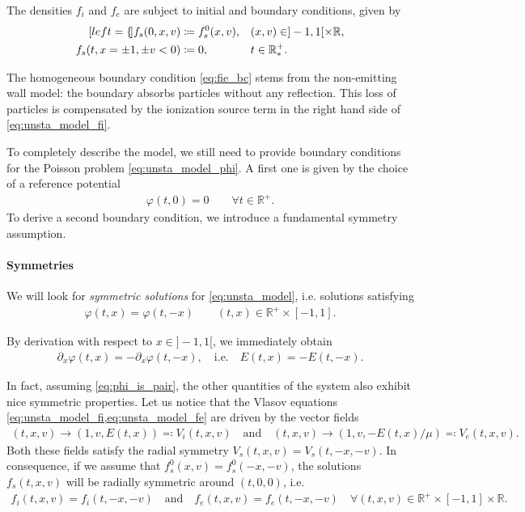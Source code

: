 \documentclass{article}
\numberwithin{equation}{section}
\newcommand{\R}{\mathbb{R}}
\newcommand{\mysubeq}[2]{ %
	\begin{subequations}\label{#1}
		\begin{align}[left = {\empheqlbrace}]
			#2
		\end{align}
	\end{subequations}	
}
\begin{document}
The densities $f_i$ and $f_e$ are subject to initial and boundary conditions, given by
\mysubeq{eq:unsta_model_bc}{
	f_{s}(0,x,v) &\coloneqq f_{s}^0(x,v), && (x,v) \in ]-1,1[ \times \R, \label{eq:init} \\
	f_{s}(t,x=\pm 1,\pm v < 0) &\coloneqq 0,  && t \in \R^+_*. \label{eq:fie_bc}
}
The homogeneous boundary condition \cref{eq:fie_bc} stems from the non-emitting wall model: the boundary absorbs particles without any reflection. This loss of particles is compensated by the ionization source term in the right hand side of \eqref{eq:unsta_model_fi}. 

To completely describe the model, we still need to provide boundary conditions for the Poisson problem \cref{eq:unsta_model_phi}. A first one is given by the choice of a reference potential
\begin{align}
	\varphi(t,0) = 0 \quad \quad \forall t \in \R^+. \label{eq:phi_nul_0}
\end{align}
To derive a second boundary condition, we introduce a fundamental symmetry assumption.

\paragraph{Symmetries}

We will look for \emph{symmetric solutions} for \cref{eq:unsta_model}, i.e. solutions satisfying 
\begin{align}\label{eq:phi_is_pair}
	\varphi(t,x) = \varphi (t,-x) \quad \quad (t,x) \in \R^+ \times [-1,1].
\end{align}

By derivation with respect to $x \in ]-1,1[$, we immediately obtain 
\begin{align*}
	\partial_x \varphi(t,x) = - \partial_x \varphi (t,-x), \quad \text{i.e.} \quad E(t,x) = - E(t,-x).
\end{align*}
 
In fact, assuming \cref{eq:phi_is_pair}, the other quantities of the system also exhibit nice symmetric properties. Let us notice that the Vlasov equations \cref{eq:unsta_model_fi,eq:unsta_model_fe} are driven by the vector fields
\begin{align*}
	(t,x,v) \to (1, v, E(t,x)) \eqqcolon V_i(t,x,v) \quad \text{and} \quad (t,x,v) \to (1, v, -E(t,x)/\mu) \eqqcolon V_e(t,x,v).
\end{align*}
 Both these fields satisfy the radial symmetry $V_s(t,x,v) = V_s(t,-x,-v)$. In consequence, if we assume that $f_s^0(x,v)=f_s^0(-x,-v)$, the solutions $f_s(t,x,v)$ will be radially symmetric around $(t,0,0)$, i.e. 
 \begin{align*}
 	f_i(t,x,v) = f_i(t,-x,-v) \quad \text{and} \quad f_e(t,x,v) = f_e(t,-x,-v) \quad \forall (t,x,v) \in \R^+ \times [-1,1] \times \mathbb{R}.
 \end{align*}
\end{document}
